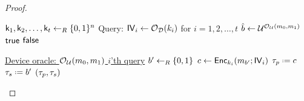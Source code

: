 \begin{proof}
\begin{Algorithm}[]{7cm}
\captionDistinguisher
\caption{$\dist$}
\label{alg:symdistinguisher}
\begin{algorithmic}[1] 
\State $\mathsf{k}_1,\mathsf{k}_2,\ldots,\mathsf{k}_t\leftarrow_R\{0,1\}^n$
\State Query: $\mathsf{IV}_i\leftarrow\operatorname{\mathcal{O}}_{\operatorname{\mathcal{D}}}(k_i)$ for $i=1,2,\ldots,t$
\State $\hat{b}\leftarrow\mathcal{U}^{\operatorname{\mathcal{O}}_{\mathcal{U}}(m_0,m_1)}$
\State \Ret $\mathsf{true}$
\State \Ret $\mathsf{false}$
\EndIf
\Statex\hrulefill
\end{algorithmic}
\begin{algorithmic}[1]
\Statex \underline{Device oracle: \textbf{$\operatorname{\mathcal{O}}_{\mathcal{U}}(m_0,m_1)$} $i$'th query}
\Statex
\State $b'\leftarrow_R\{0,1\}$
\State $c\leftarrow\operatorname{\mathsf{Enc}}_{k_i}(m_{b'};\mathsf{IV}_i)$
\State $\ptrans\defeq c$
\State $\strans\defeq b'$
\State \Ret $(\tau_p,\tau_s)$
\end{algorithmic}
\end{Algorithm}


\end{proof}
